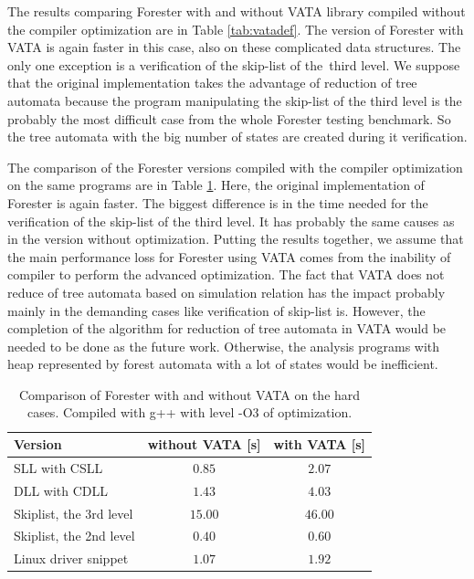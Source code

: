 The results comparing Forester with and without VATA library compiled
without the compiler optimization are in Table \ref{tab:vatadef}.
The version of Forester with VATA is again faster in this case, also
on these complicated data structures.
The only one exception is a verification of the skip-list of the~third
level.
We suppose that the original implementation takes the advantage of
reduction of tree automata because the program manipulating the skip-list
of the third level is the probably the most difficult case from the whole
Forester testing benchmark.
So the tree automata with the big number of states
are created during it verification.

The comparison of the Forester versions compiled with the compiler optimization
on the same programs are in Table \ref{tab:vataopt}.
Here, the original implementation of Forester is again faster.
The biggest difference is in the time needed for the verification of the skip-list of the third level.
It has probably the same causes as in the version without optimization.
Putting the results together, we assume that the main performance
loss for Forester using VATA comes from the inability of compiler
to perform the advanced optimization.
The fact that VATA does not reduce of tree automata based on simulation relation
has the impact probably mainly in the demanding cases like verification of skip-list is.
However, the completion of the algorithm for reduction of tree automata in VATA would be
needed to be done as the future work.
Otherwise, the analysis programs with heap represented by forest automata
with a lot of states would be inefficient.

\begin{table}[bt]
	\vskip6pt
	\caption{Comparison of Forester with and without VATA on the hard cases.
		Compiled with g++ with level -O3 of optimization.
	}
	\centering
	\begin{tabular}{|l | c | c |}
		\hline
		Version & without VATA [s] & with VATA [s] \\
		\hline
		\hline
		SLL with CSLL            & $0.85$ & $2.07$  \\
		\hline
		DLL with CDLL            & $1.43$ & $4.03$ \\
		\hline
		Skiplist, the 3rd level  & $15.00$ & $46.00$ \\
		\hline
		Skiplist, the 2nd level  & $0.40$ & $0.60$  \\
		\hline
		Linux driver snippet     & $1.07$ & $1.92$  \\ 
		\hline
	\end{tabular}
	\label{tab:vataopt}
\end{table}

